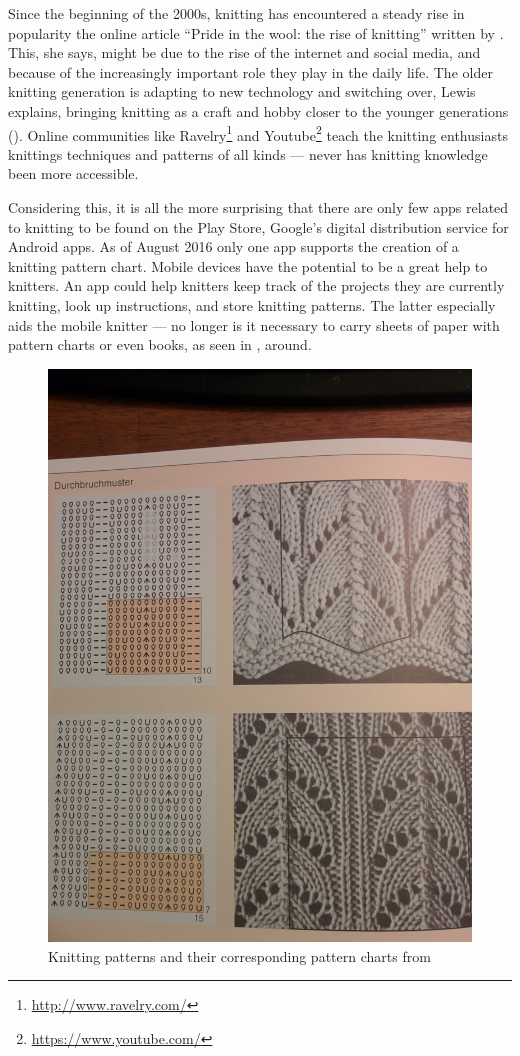 Since the beginning of the 2000s, knitting has encountered a steady rise in popularity the online article ``Pride in the wool: the rise of knitting'' written by \cite{lewis_rise_of_knitting}. This, she says, might be due to the rise of the internet and social media, and because of the increasingly important role they play in the daily life. The older knitting generation is adapting to new technology and switching over, Lewis explains, bringing knitting as a craft and hobby closer to the younger generations (\cite{lewis_rise_of_knitting}). Online communities like Ravelry\footnote{\url{http://www.ravelry.com/}} and Youtube\footnote{\url{https://www.youtube.com/}} teach the knitting enthusiasts knittings techniques and patterns of all kinds --- never has knitting knowledge been more accessible.

Considering this, it is all the more surprising that there are only few apps related to knitting to be found on the Play Store, Google's digital distribution service for Android apps. As of August 2016 only one app supports the creation of a knitting pattern chart. Mobile devices have the potential to be a great help to knitters. An app could help knitters keep track of the projects they are currently knitting, look up instructions, and store knitting patterns. The latter especially aids the mobile knitter --- no longer is it necessary to carry sheets of paper with pattern charts or even books, as seen in , around.

\begin{figure}[H]
	\centering
    \includegraphics[width=.45\textwidth]{images/knitting_pattern_chart_book.jpg}
   \caption[{Knitting patterns and their corresponding pattern charts \protect{}}]{Knitting patterns and their corresponding pattern charts from \protect\cite[p142]{Natter1983}}
   \label{fig:knitting_book}
\end{figure}

